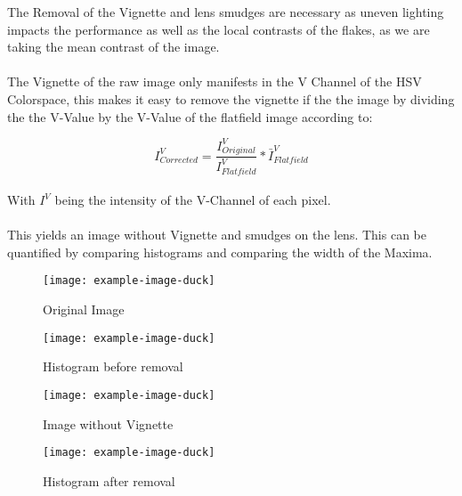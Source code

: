 The Removal of the Vignette and lens smudges are necessary as uneven lighting impacts the performance as well as the local contrasts of the flakes, as we are taking the mean contrast of the image.\\
\\
The Vignette of the raw image only manifests in the V Channel of the HSV Colorspace, this makes it easy to remove the vignette if the the image by dividing the the V-Value by the V-Value of the flatfield image according to:

\begin{equation}
    I^V_{Corrected} = \frac{I^V_{Original}}{I^V_{Flatfield}} * \bar{I}^V_{Flatfield}
\end{equation}
\\
With $I^V$ being the intensity of the V-Channel of each pixel.\\
\\
This yields an image without Vignette and smudges on the lens. This can be quantified by comparing histograms and comparing the width of the Maxima.

\begin{figure}[ht] 
  \label{ fig7} 
  \begin{minipage}[b]{0.45\linewidth}
    \centering
    \texttt{[image: example-image-duck]} 
    \caption{Original Image} 
    \vspace{4ex}
  \end{minipage}%
  \begin{minipage}[b]{0.45\linewidth}
    \centering
    \texttt{[image: example-image-duck]} 
    \caption{Histogram before removal} 
    \vspace{4ex}
  \end{minipage} 
  \begin{minipage}[b]{0.45\linewidth}
    \centering
    \texttt{[image: example-image-duck]} 
    \caption{Image without Vignette} 
    \vspace{4ex}
  \end{minipage}%
  \begin{minipage}[b]{0.45\linewidth}
    \centering
    \texttt{[image: example-image-duck]} 
    \caption{Histogram after removal} 
    \vspace{4ex}
  \end{minipage} 
\end{figure}